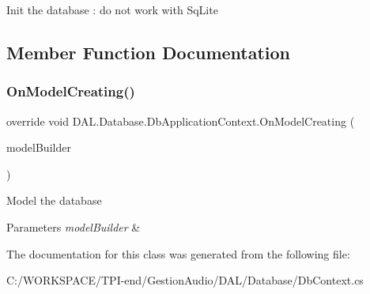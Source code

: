 Init the database \+: do not work with Sq\+Lite 



\subsection{Member Function Documentation}
\mbox{\label{class_d_a_l_1_1_database_1_1_db_application_context_a19a77500b7e8ab9e3570a5abd81dc542}} 
\subsubsection{\texorpdfstring{On\+Model\+Creating()}{OnModelCreating()}}
{\footnotesize\ttfamily override void D\+A\+L.\+Database.\+Db\+Application\+Context.\+On\+Model\+Creating (\begin{DoxyParamCaption}\item[{Db\+Model\+Builder}]{model\+Builder }\end{DoxyParamCaption})\hspace{0.3cm}{\ttfamily [protected]}}



Model the database 


\begin{DoxyParams}{Parameters}
{\em model\+Builder} & \\
\hline
\end{DoxyParams}


The documentation for this class was generated from the following file\+:\begin{DoxyCompactItemize}
\item 
C\+:/\+W\+O\+R\+K\+S\+P\+A\+C\+E/\+T\+P\+I-\/end/\+Gestion\+Audio/\+D\+A\+L/\+Database/Db\+Context.\+cs\end{DoxyCompactItemize}
